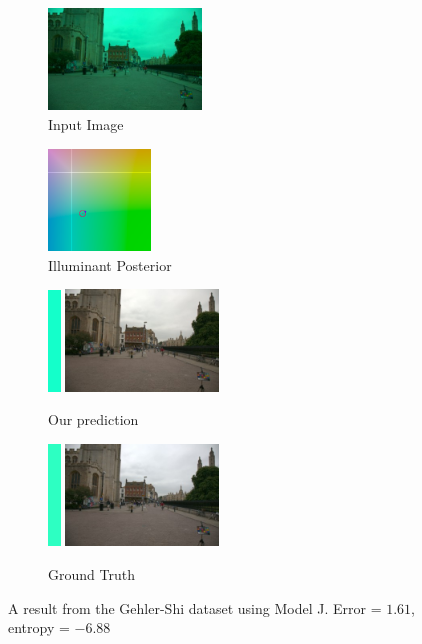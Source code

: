 \documentclass[10pt,twocolumn,letterpaper]{article}
\begin{document}
\begin{figure}[!]
\centering
  \begin{subfigure}[!]{1.7in}
    \includegraphics[width=1.6in]{figures/results/gehlershi/00000440_input.jpg}
    \caption{\footnotesize Input Image}
  \end{subfigure}
  \begin{subfigure}[!]{1.17in}
    \includegraphics[width=1.07in]{figures/results/gehlershi/00000440_chroma.png}
    \caption{\footnotesize Illuminant Posterior}
  \end{subfigure}
\begin{subfigure}[!]{1.9in}
    \includegraphics[width=0.133in]{figures/results/gehlershi/00000440_illum.png}\!
    \includegraphics[width=1.6in]{figures/results/gehlershi/00000440_prediction.jpg}
    \caption{\footnotesize Our prediction}
  \end{subfigure}
  \begin{subfigure}[!]{1.9in}
    \includegraphics[width=0.133in]{figures/results/gehlershi/00000440_illum_true.png}\!
    \includegraphics[width=1.6in]{figures/results/gehlershi/00000440_true.jpg}
    \caption{\footnotesize Ground Truth}
  \end{subfigure}
  \caption{
    A result from the Gehler-Shi dataset using Model J. Error = $1.61$\textdegree, entropy = $-6.88$
    \label{fig:results7}
  }
\end{figure}
\end{document}
